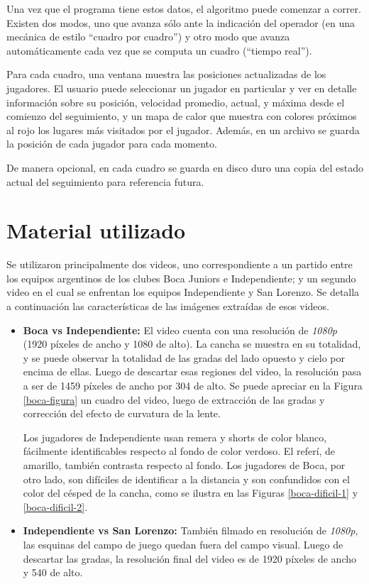 Una vez que el programa tiene estos datos, el algoritmo puede comenzar a
correr. Existen dos modos, uno que avanza sólo ante la indicación del operador
(en una mecánica de estilo ``cuadro por cuadro'') y otro modo que avanza
automáticamente cada vez que se computa un cuadro (``tiempo real'').

Para cada cuadro, una ventana muestra las posiciones actualizadas de los
jugadores. El usuario puede seleccionar un jugador en particular y ver en
detalle información sobre su posición, velocidad promedio, actual, y máxima
desde el comienzo del seguimiento, y un mapa de calor que muestra con colores
próximos al rojo los lugares más visitados por el jugador. Además, en un
archivo se guarda la posición de cada jugador para cada momento.

De manera opcional, en cada cuadro se guarda en disco duro una copia del estado
actual del seguimiento para referencia futura.

\section{Material utilizado}

Se utilizaron principalmente dos videos, uno correspondiente a un partido entre
los equipos argentinos de los clubes Boca Juniors e Independiente; y un segundo
video en el cual se enfrentan los equipos Independiente y San Lorenzo. Se
detalla a continuación las características de las imágenes extraídas de esos
videos.

\begin{itemize}

  \item \textbf{Boca vs Independiente:} El video cuenta con una resolución de
    \textit{1080p} (1920 píxeles de ancho y 1080 de alto). La cancha se muestra
    en su totalidad, y se puede observar la totalidad de las gradas del lado
    opuesto y cielo por encima de ellas. Luego de descartar esas regiones del
    video, la resolución pasa a ser de 1459 píxeles de ancho por 304 de alto.
    Se puede apreciar en la Figura \ref{boca-figura} un cuadro del video, luego
    de extracción de las gradas y corrección del efecto de curvatura de la
    lente.

    Los jugadores de Independiente usan remera y shorts de color blanco,
    fácilmente identificables respecto al fondo de color verdoso. El referí, de
    amarillo, también contrasta respecto al fondo. Los jugadores de Boca, por
    otro lado, son difíciles de identificar a la distancia y son confundidos
    con el color del césped de la cancha, como se ilustra en las Figuras
    \ref{boca-dificil-1} y \ref{boca-dificil-2}.

  \item \textbf{Independiente vs San Lorenzo:} También filmado en resolución de
    \textit{1080p}, las esquinas del campo de juego quedan fuera del campo
    visual. Luego de descartar las gradas, la resolución final del video es de
    1920 píxeles de ancho y 540 de alto.

\end{itemize}

